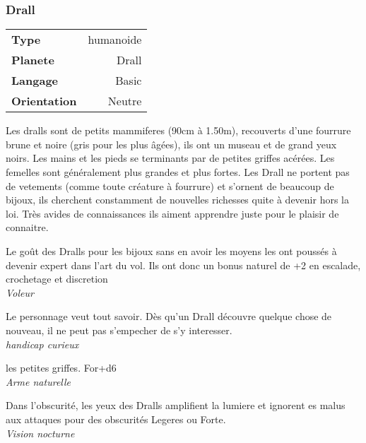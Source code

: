 \subsubsection{Drall} 
	\begin{flushright}	
		\begin{tabular}{|l|r|}
		\textbf{Type} & humanoide \\
		\textbf{Planete} & Drall \\
		\textbf{Langage} & Basic \\
		\textbf{Orientation} & Neutre\\
		\end{tabular}
	\end{flushright}

Les dralls sont de petits mammiferes (90cm à 1.50m), recouverts d'une fourrure brune et noire (gris pour les plus âgées), 
ils ont un museau et de grand yeux noirs. Les mains et les pieds se terminants par de petites griffes acérées. 
Les femelles sont généralement plus grandes et plus fortes. Les Drall ne portent pas de vetements (comme toute créature à fourrure) 
et s'ornent de beaucoup de bijoux, ils cherchent constamment de nouvelles richesses quite à devenir hors la loi. 
Très avides de connaissances ils aiment apprendre juste pour le plaisir de connaitre. \\

\begin{description}[align=left]

 \item[L'or dans les yeux]    %
 	Le goût des Dralls pour les bijoux sans en avoir les moyens les ont poussés à devenir expert dans l'art du vol.
 	Ils ont donc un bonus naturel de +2 en escalade, crochetage et discretion\\
 	\textit{Voleur}
 	
 \item[Mourir moins bête]       %
 	Le personnage veut tout savoir. Dès qu'un Drall découvre quelque chose de nouveau, il ne peut pas s'empecher de s'y interesser.\\
    	\textit{handicap curieux} \\

\item[Griffes retractables]    %
	les petites griffes. For+d6\\
	\textit{Arme naturelle}\\
    
\item[Vision Nocturne]  %
	Dans l'obscurité, les yeux des Dralls amplifient la lumiere et ignorent es malus aux attaques pour des obscurités Legeres ou Forte.\\
	\textit{Vision nocturne}\\

\end{description}


